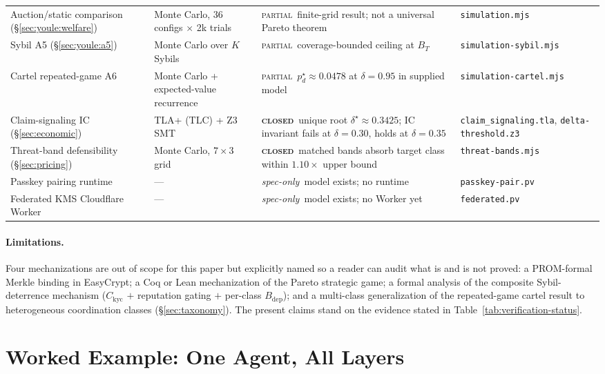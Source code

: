 \documentclass[11pt,a4paper]{article}
\newcommand{\Closed}{{\textcolor{hhink}{\textsc{\textbf{closed}}}}}
\newcommand{\Partial}{{\textcolor{hhink}{\textsc{partial}}}}
\newcommand{\SpecOnly}{{\textcolor{hhgray}{\textit{spec-only}}}}
\theoremstyle{definition}
\theoremstyle{remark}
\begin{document}
\begin{table}[H]
\begin{tabularx}{\textwidth}{@{}>{\raggedright\arraybackslash}p{} >{\raggedright\arraybackslash}p{} >{\raggedright\arraybackslash}X >{\raggedright\arraybackslash}p{}@{}}
Auction/static comparison (\S\ref{sec:youle:welfare}) & Monte Carlo, 36 configs $\times$ 2k trials & \Partial\ finite-grid result; not a universal Pareto theorem & \texttt{simulation.mjs} \\
Sybil A5 (\S\ref{sec:youle:a5}) & Monte Carlo over $K$ Sybils & \Partial\ coverage-bounded ceiling at $B_T$ & \texttt{simulation-sybil.mjs} \\
Cartel repeated-game A6 & Monte Carlo + expected-value recurrence & \Partial\ $p_d^\star{\approx}0.0478$ at $\delta{=}0.95$ in supplied model & \texttt{simulation-cartel.mjs} \\
Claim-signaling IC (\S\ref{sec:economic}) & TLA+ (TLC) + Z3 SMT & \Closed\ unique root $\delta^\star{\approx}0.3425$; IC invariant fails at $\delta = 0.30$, holds at $\delta = 0.35$ & \texttt{claim\_signaling.tla}, \texttt{delta-threshold.z3} \\
Threat-band defensibility (\S\ref{sec:pricing}) & Monte Carlo, $7{\times}3$ grid & \Closed\ matched bands absorb target class within $1.10\times$ upper bound & \texttt{threat-bands.mjs} \\
\midrule
Passkey pairing runtime & --- & \SpecOnly\ model exists; no runtime & \texttt{passkey-pair.pv} \\
Federated KMS Cloudflare Worker & --- & \SpecOnly\ model exists; no Worker yet & \texttt{federated.pv} \\
\bottomrule
\end{tabularx}
\end{table}

\paragraph{Limitations.} Four mechanizations are out of scope for this paper but explicitly named so a reader can audit what is and is not proved: a PROM-formal Merkle binding in EasyCrypt; a Coq or Lean mechanization of the Pareto strategic game; a formal analysis of the composite Sybil-deterrence mechanism ($C_{\mathrm{kyc}}$ $+$ reputation gating $+$ per-class $B_{\mathrm{dep}}$); and a multi-class generalization of the repeated-game cartel result to heterogeneous coordination classes (\S\ref{sec:taxonomy}). The present claims stand on the evidence stated in Table~\ref{tab:verification-status}.

\section{Worked Example: One Agent, All Layers}\label{app:worked}
\end{document}
